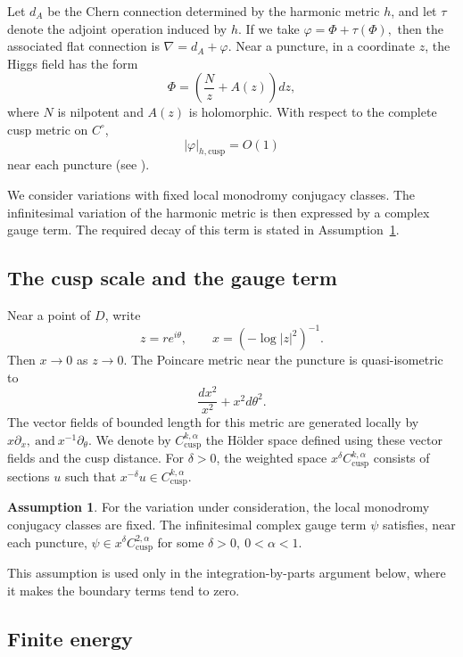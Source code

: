 \documentclass[11pt,reqno]{amsart}
\numberwithin{equation}{section}
\theoremstyle{plain}
\theoremstyle{definition}
\newtheorem{assumption}[theorem]{Assumption}
\theoremstyle{remark}
\begin{document}
Let \(d_A\) be the Chern connection determined by the harmonic metric
\(h\), and let \(\tau\) denote the adjoint operation induced by \(h\). If we take
\(
        \varphi=\Phi+\tau(\Phi),
\)
then the associated flat connection is
\(
        \nabla=d_A+\varphi.
\)
Near a puncture, in a coordinate \(z\), the Higgs field has the form
\[
        \Phi=
        \left(
        \frac{N}{z}+A(z)
        \right)dz,
\]
where \(N\) is nilpotent and \(A(z)\) is holomorphic. With respect to the
complete cusp metric on \(C^\circ\),
\[
        |\varphi|_{h,\mathrm{cusp}}=O(1)
\]
near each puncture (see \cite{Simpson1990,MochizukiNilpotent}). 

We consider variations with fixed local monodromy conjugacy classes. The
infinitesimal variation of the harmonic metric is then expressed by a complex
gauge term. The required decay of this term is stated in
Assumption~\ref{ass:cusp-slice}.


\subsection{The cusp scale and the gauge term}

Near a point of \(D\), write
\[
        z=re^{i\theta},
        \qquad
        x=(-\log |z|^2)^{-1}.
\]
Then \(x\to0\) as \(z\to0\).  The Poincare metric near the puncture is
quasi-isometric to
\[
        \frac{dx^2}{x^2}+x^2d\theta^2.
\]
The vector fields of bounded length for this metric are generated locally by
\(
        x\partial_x,
        \ \text{and} \
        x^{-1}\partial_\theta.
\)
We denote by
\(
        C_{\mathrm{cusp}}^{k,\alpha}
\)
the Hölder space defined using these vector fields and the cusp distance.  For
\(\delta>0\), the weighted space
\(
        x^\delta C_{\mathrm{cusp}}^{k,\alpha}
\)
consists of sections \(u\) such that
\(
        x^{-\delta}u\in C_{\mathrm{cusp}}^{k,\alpha}.
\)


\begin{assumption}
\label{ass:cusp-slice}
For the variation under consideration, the local monodromy conjugacy classes
are fixed. The infinitesimal complex gauge term \(\psi\) satisfies, near each
puncture,
\(
        \psi\in x^\delta C_{\mathrm{cusp}}^{2,\alpha}
\)
for some
\(
        \delta>0,
        \
        0<\alpha<1.
\)
\end{assumption}

This assumption is used only in the integration-by-parts argument below, where it makes the boundary terms tend to zero.


\subsection{Finite energy}
\end{document}

